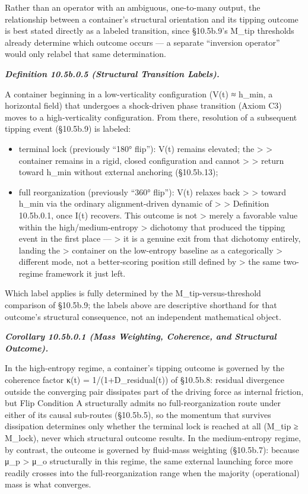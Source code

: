 \documentclass[
]{article}
\begin{document}
Rather than an operator with an ambiguous, one-to-many output, the
relationship between a container's structural orientation and its
tipping outcome is best stated directly as a labeled transition, since
§10.5b.9's M\_tip thresholds already determine which outcome occurs ---
a separate ``inversion operator'' would only relabel that same
determination.

\emph{\textbf{Definition 10.5b.0.5 (Structural Transition Labels).}}

A container beginning in a low-verticality configuration (V(t) ≈ h\_min,
a horizontal field) that undergoes a shock-driven phase transition
(Axiom C3) moves to a high-verticality configuration. From there,
resolution of a subsequent tipping event (§10.5b.9) is labeled:

\begin{itemize}
\item
  terminal lock (previously ``180° flip''): V(t) remains elevated; the
  \textgreater{} \textgreater{} container remains in a rigid, closed
  configuration and cannot \textgreater{} \textgreater{} return toward
  h\_min without external anchoring (§10.5b.13);
\item
  full reorganization (previously ``360° flip''): V(t) relaxes back
  \textgreater{} \textgreater{} toward h\_min via the ordinary
  alignment-driven dynamic of \textgreater{} \textgreater{} Definition
  10.5b.0.1, once I(t) recovers. This outcome is not \textgreater{}
  merely a favorable value within the high/medium-entropy \textgreater{}
  dichotomy that produced the tipping event in the first place ---
  \textgreater{} it is a genuine exit from that dichotomy entirely,
  landing the \textgreater{} container on the low-entropy baseline as a
  categorically \textgreater{} different mode, not a better-scoring
  position still defined by \textgreater{} the same two-regime framework
  it just left.
\end{itemize}

Which label applies is fully determined by the M\_tip-versus-threshold
comparison of §10.5b.9; the labels above are descriptive shorthand for
that outcome's structural consequence, not an independent mathematical
object.

\emph{\textbf{Corollary 10.5b.0.1 (Mass Weighting, Coherence, and
Structural Outcome).}}

In the high-entropy regime, a container's tipping outcome is governed by
the coherence factor κ(t) = 1/(1+D\_residual(t)) of §10.5b.8: residual
divergence outside the converging pair dissipates part of the driving
force as internal friction, but Flip Condition A structurally admits no
full-reorganization route under either of its causal sub-routes
(§10.5b.5), so the momentum that survives dissipation determines only
whether the terminal lock is reached at all (M\_tip ≥ M\_lock), never
which structural outcome results. In the medium-entropy regime, by
contrast, the outcome is governed by fluid-mass weighting (§10.5b.7):
because μ\_p \textgreater{} μ\_o structurally in this regime, the same
external launching force more readily crosses into the
full-reorganization range when the majority (operational) mass is what
converges.
\end{document}
